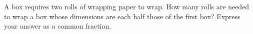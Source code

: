 A box requires two rolls of wrapping paper to wrap. How many rolls are needed to wrap a box whose dimensions are each half those of the first box? Express your answer as a common fraction.
